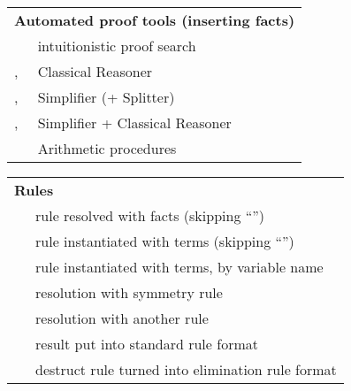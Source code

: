 \begin{isabellebody}
\begin{isamarkuptext}
\begin{tabular}{ll}
    \multicolumn{2}{l}{\textbf{Automated proof tools (inserting facts)}} \\[0.5ex]
    \hyperlink{method.iprover}{\mbox{\isa{iprover}}} & intuitionistic proof search \\
    \hyperlink{method.blast}{\mbox{\isa{blast}}}, \hyperlink{method.fast}{\mbox{\isa{fast}}} & Classical Reasoner \\
    \hyperlink{method.simp}{\mbox{\isa{simp}}}, \hyperlink{method.simp-all}{\mbox{\isa{simp{\isaliteral{5F}{\isacharunderscore}}all}}} & Simplifier (+ Splitter) \\
    \hyperlink{method.auto}{\mbox{\isa{auto}}}, \hyperlink{method.force}{\mbox{\isa{force}}} & Simplifier + Classical Reasoner \\
    \hyperlink{method.arith}{\mbox{\isa{arith}}} & Arithmetic procedures \\
  \end{tabular}%
\end{isamarkuptext}%
\isamarkuptrue%
%
\isamarkuptrue%
%
\begin{isamarkuptext}%
\begin{tabular}{ll}
    \multicolumn{2}{l}{\textbf{Rules}} \\[0.5ex]
    \hyperlink{attribute.OF}{\mbox{\isa{OF}}}~\isa{a} & rule resolved with facts (skipping ``\isa{{\isaliteral{5F}{\isacharunderscore}}}'') \\
    \hyperlink{attribute.of}{\mbox{\isa{of}}}~\isa{t} & rule instantiated with terms (skipping ``\isa{{\isaliteral{5F}{\isacharunderscore}}}'') \\
    \hyperlink{attribute.where}{\mbox{\isa{where}}}~\isa{{\isaliteral{22}{\isachardoublequote}}x\ {\isaliteral{3D}{\isacharequal}}\ t{\isaliteral{22}{\isachardoublequote}}} & rule instantiated with terms, by variable name \\
    \hyperlink{attribute.symmetric}{\mbox{\isa{symmetric}}} & resolution with symmetry rule \\
    \hyperlink{attribute.THEN}{\mbox{\isa{THEN}}}~\isa{b} & resolution with another rule \\
    \hyperlink{attribute.rule-format}{\mbox{\isa{rule{\isaliteral{5F}{\isacharunderscore}}format}}} & result put into standard rule format \\
    \hyperlink{attribute.elim-format}{\mbox{\isa{elim{\isaliteral{5F}{\isacharunderscore}}format}}} & destruct rule turned into elimination rule format \\[1ex]


\end{tabular}
\end{isamarkuptext}
\end{isabellebody}
